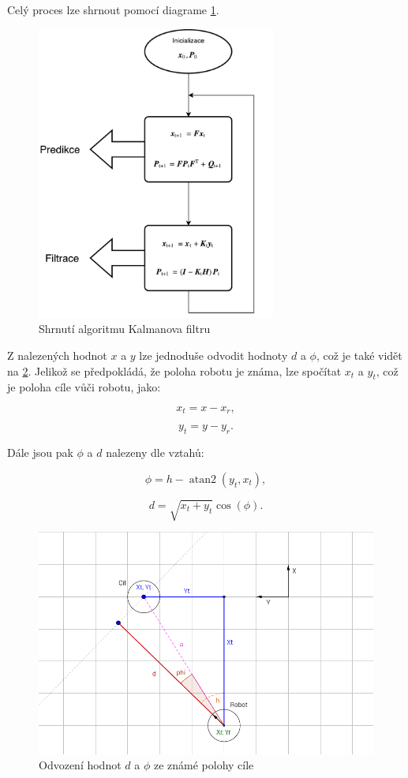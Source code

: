 \documentclass[twoside]{ctuthesis}
\theoremstyle{plain}
\theoremstyle{definition}
\theoremstyle{note}
\DeclareMathOperator{\atantwo}{atan2}
\begin{document}
Celý proces lze shrnout pomocí diagrame \ref{kalman_diag}.
\begin{figure}[H]
	\caption{Shrnutí algoritmu Kalmanova filtru}

	\label{kalman_diag}
	\includegraphics[width=0.7\textwidth, height=0.7\textwidth]{images/2/kalman_diagram.pdf}
\end{figure}
Z nalezených hodnot $x$ a $y$ lze jednoduše odvodit hodnoty $d$ a $\phi$, což je také vidět na \ref{inv}. Jelikož se předpokládá, že poloha robotu je známa, lze spočítat $x_t$ a $y_t$, což je poloha cíle vůči robotu, jako:

\begin{equation}
x_t = x - x_r,
\end{equation}

\begin{equation}
y_t = y - y_r.
\end{equation}

Dále jsou pak $\phi$ a $d$ nalezeny dle vztahů:

\begin{equation}
\phi = h - \atantwo(y_t, x_t),
\end{equation}

\begin{equation}
d = \sqrt{x_t + y_t}\cos(\phi).
\end{equation}
\begin{figure}
	\caption{Odvození hodnot $d$ a $\phi$ ze známé polohy cíle}

	\label{inv}
	\includegraphics[width=1\textwidth]{images/2/neco.png}
\end{figure}
\end{document}
